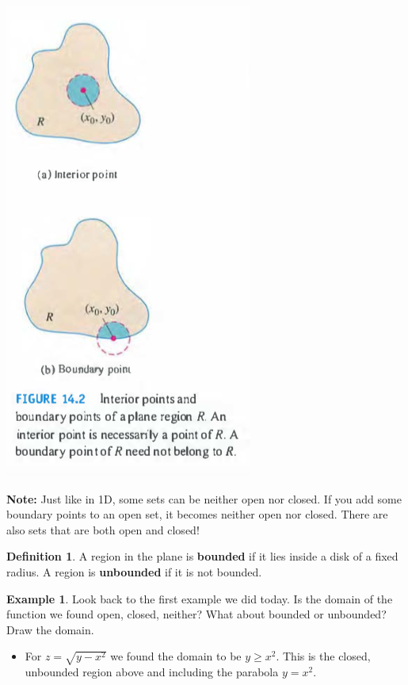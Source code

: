 \documentclass[12pt, letter]{article}
\theoremstyle{plain}
\numberwithin{theorem}{section}
\theoremstyle{definition}
\newtheorem{definition}[theorem]{Definition}
\newtheorem{example}[theorem]{Example}
\begin{document}
\bigskip

\begin{center}
\includegraphics[scale=0.7]{m2_f1}
\end{center}

\bigskip

\textbf{Note:} Just like in 1D, some sets can be neither open nor closed. If you add some boundary points to an open set, it becomes neither open nor closed. There are also sets that are both open and closed!

\bigskip

\hrulefill

\bigskip

\begin{definition}
A region in the plane is \textbf{bounded} if it lies inside a disk of a fixed radius. A region is \textbf{unbounded} if it is not bounded.
\end{definition}

\bigskip

\hrulefill

\bigskip

\begin{example}
Look back to the first example we did today. Is the domain of the function we found open, closed, neither? What about bounded or unbounded? Draw the domain.

\smallskip

\begin{itemize}
\item For $z=\sqrt{y-x^2}$ we found the domain to be $y\geq x^2$. This is the closed, unbounded region above and including the parabola $y=x^2$.
\end{itemize}
\end{example}
\end{document}
